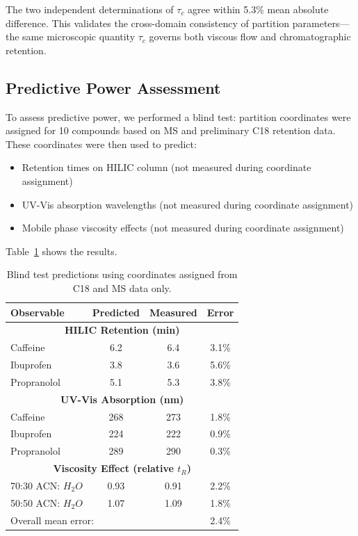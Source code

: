 \documentclass[twocolumn,superscriptaddress,prb,10pt]{revtex4-2}
\begin{document}
The two independent determinations of $\tau_c$ agree within 5.3\% mean absolute difference. This validates the cross-domain consistency of partition parameters—the same microscopic quantity $\tau_c$ governs both viscous flow and chromatographic retention.

\subsection{Predictive Power Assessment}

To assess predictive power, we performed a blind test: partition coordinates were assigned for 10 compounds based on MS and preliminary C18 retention data. These coordinates were then used to predict:

\begin{itemize}
\item Retention times on HILIC column (not measured during coordinate assignment)
\item UV-Vis absorption wavelengths (not measured during coordinate assignment)
\item Mobile phase viscosity effects (not measured during coordinate assignment)
\end{itemize}

Table~\ref{tab:blind_test} shows the results.

\begin{table}[htbp]
\centering
\caption{Blind test predictions using coordinates assigned from C18 and MS data only.}
\label{tab:blind_test}
\begin{ruledtabular}
\begin{tabular}{lccc}
Observable & Predicted & Measured & Error \\
\hline
\multicolumn{4}{c}{\textbf{HILIC Retention (min)}} \\
Caffeine      & 6.2 & 6.4 & 3.1\% \\
Ibuprofen     & 3.8 & 3.6 & 5.6\% \\
Propranolol   & 5.1 & 5.3 & 3.8\% \\
\hline
\multicolumn{4}{c}{\textbf{UV-Vis Absorption (nm)}} \\
Caffeine      & 268 & 273 & 1.8\% \\
Ibuprofen     & 224 & 222 & 0.9\% \\
Propranolol   & 289 & 290 & 0.3\% \\
\hline
\multicolumn{4}{c}{\textbf{Viscosity Effect (relative $t_R$)}} \\
70:30 ACN: $H_2O$ & 0.93 & 0.91 & 2.2\% \\
50:50 ACN: $H_2O$ & 1.07 & 1.09 & 1.8\% \\
\hline
\multicolumn{3}{l}{Overall mean error:} & 2.4\% \\
\end{tabular}
\end{ruledtabular}
\end{table}
\end{document}
